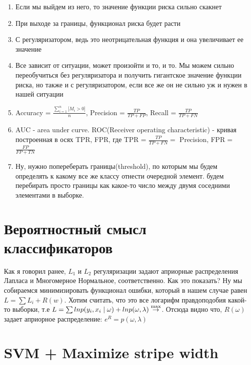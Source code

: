 \documentclass{article}
\newcommand{\totext}[1]{\stackrel{\textup{#1}}{\to}}
\theoremstyle{plain}
\theoremstyle{definition}
\begin{document}
\begin{enumerate}
	\item Если мы выйдем из него, то значение функции риска сильно скакнет 
	\item При выходе за границы, функционал риска будет расти
	\item С регуляризатором, ведь это неотрицательная функция и она увеличивает ее значение
	\item Все зависит от ситуации, может произойти и то, и то. Мы можем сильно переобучиться без регуляризатора и получить гигантское значение функции риска, но также и с регуляризатором, если все же он не сильно уж и нужен в нашей ситуации
	\item Accuracy = $\frac{\sum\limits_{i = 1}^n \lbrack M_i > 0  \rbrack}{n}$, Precision = $\frac{TP}{TP + FP}$, Recall = $\frac{TP}{TP + FN}$
	\item AUC - area under curve. ROC(Receiver operating characteristic) - кривая построенная в осях TPR, FPR, где TPR = $\frac{TP}{TP + FN} =$ Precision, FPR = $\frac{FP}{FP + TN}$
	\item Ну, нужно попереберать границы(threshold), по которым мы будем определять к какому все же классу отнести очередной элемент. будем перебирать просто границы как какое-то число между двумя соседними элементами в выборке.
	
\end{enumerate}

\section{Вероятностный смысл классификаторов}

Как я говорил ранее, $L_1$ и  $L_2$ регуляризации задают априорные распределения Лапласа и Многомерное Нормальное, соответственно. Как это показать? Ну мы собираемся минимизировать функционал ошибки, который в нашем случае равен $L = \sum L_i + R(w)$. Хотим считать, что это все логарифм правдоподобия какой-то выборки, т.е $L = \sum lnp(y_i, x_i \mid \omega) + lnp(\omega, \lambda) \totext{max}$. Отсюда видно что, $R(\omega)$ задает априорное распределение: $e^R = p(\omega, \lambda)$
	
\section{SVM + Maximize stripe width}
	
\end{document}
